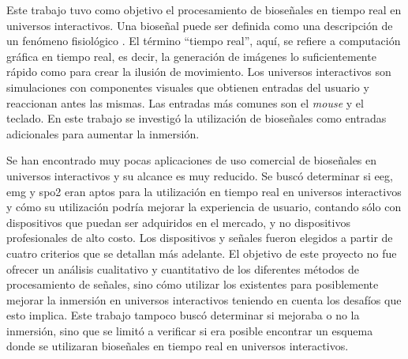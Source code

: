 Este trabajo tuvo como objetivo el procesamiento de bioseñales en tiempo real en universos interactivos. Una bioseñal puede ser definida como una descripción de un fenómeno fisiológico \cite{biosignal-book-2}.  El término ``tiempo real'', aquí, se refiere a computación gráfica en tiempo real, es decir, la generación de imágenes lo suficientemente rápido como para crear la ilusión de movimiento. Los universos interactivos son simulaciones con componentes visuales que obtienen entradas del usuario y reaccionan antes las mismas. Las entradas más comunes son el \emph{mouse} y el teclado. En este trabajo se investigó la utilización de bioseñales como entradas adicionales para aumentar la inmersión.

Se han encontrado muy pocas aplicaciones de uso comercial de bioseñales en universos interactivos y su alcance es muy reducido\cite{neurogaming}. Se buscó determinar si \acrshort{eeg}, \acrshort{emg} y \acrshort{spo2} eran aptos para la utilización en tiempo real en universos interactivos y cómo su utilización podría mejorar la experiencia de usuario, contando sólo con dispositivos que puedan ser adquiridos en el mercado, y no dispositivos profesionales de alto costo. Los dispositivos y señales fueron elegidos a partir de cuatro criterios que se detallan más adelante. El objetivo de este proyecto no fue ofrecer un análisis cualitativo y cuantitativo de los diferentes métodos de procesamiento de señales, sino cómo utilizar los existentes para posiblemente mejorar la inmersión en universos interactivos teniendo en cuenta los desafíos que esto implica. Este trabajo tampoco buscó determinar si mejoraba o no la inmersión, sino que se limitó a verificar si era posible encontrar un esquema donde se utilizaran bioseñales en tiempo real en universos interactivos.